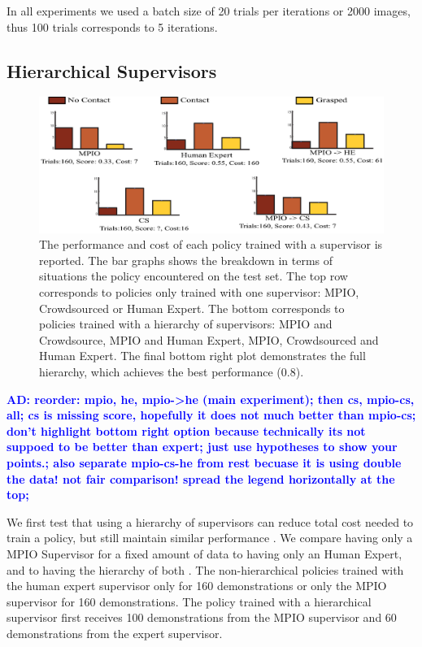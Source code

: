 \documentclass[10pt, conference]{ieeeconf}      %
\newcommand{\adnote}[1]{\ifthenelse{ \boolean{include-notes}}%
 {\textcolor{blue}{\textbf{AD: #1}}}{}}
\begin{document}
In all experiments we used a batch size of 20 trials per iterations or 2000 images, thus 100 trials corresponds to 5 iterations. 

\subsection{Hierarchical Supervisors}

\begin{figure}[t]
\centering
\includegraphics{f_figs/results.eps}

\caption{ \footnotesize The performance and cost of each policy trained with a supervisor is reported. The bar graphs shows the breakdown in terms of situations the policy encountered on the test set. The top row corresponds to policies only trained with one supervisor: MPIO, Crowdsourced or Human Expert. The bottom corresponds to policies trained with a hierarchy of supervisors: MPIO and Crowdsource, MPIO and Human Expert, MPIO, Crowdsourced and Human Expert. The final bottom right plot demonstrates the full hierarchy, which achieves the best performance (0.8).   }
\vspace*{-20pt}
\label{fig:perf_results}
\end{figure}
\adnote{reorder: mpio, he, mpio->he (main experiment); then cs, mpio-cs, all; cs is missing score, hopefully it does not much better than mpio-cs; don't highlight bottom right option because technically its not suppoed to be better than expert; just use hypotheses to show your points.; also separate mpio-cs-he from rest becuase it is using double the data! not fair comparison! spread the legend horizontally at the top; }


We first test  that using a hierarchy of supervisors can reduce total cost needed to train a policy, but still maintain similar performance .  We compare having only a MPIO Supervisor for a fixed amount of data to having only an Human Expert, and to having the hierarchy of both . The non-hierarchical policies trained with the human expert supervisor only for 160 demonstrations or only the MPIO supervisor for 160 demonstrations.  The policy trained with a hierarchical supervisor first receives  100 demonstrations from the MPIO supervisor and  60 demonstrations from the expert supervisor. 
\end{document}
